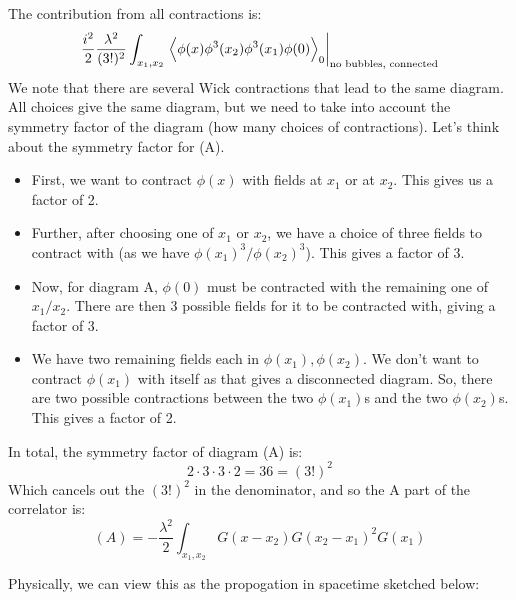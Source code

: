 The contribution from all contractions is:
\begin{equation}
    \frac{i^2}{2}\frac{\lambda^2}{(3!)^2}\int_{x_1, x_2}\left.\left< \phi(x)\phi^3(x_2)\phi^3(x_1)\phi(0) \right>_0\right|_{\text{no bubbles, connected}}
\end{equation}
We note that there are several Wick contractions that lead to the same diagram. All choices give the same diagram, but we need to take into account the symmetry factor of the diagram (how many choices of contractions). Let's think about the symmetry factor for (A). 
\begin{itemize}
    \item First, we want to contract $\phi(x)$ with fields at $x_1$ or at $x_2$. This gives us a factor of 2.
    \item Further, after choosing one of $x_1$ or $x_2$, we have a choice of three fields to contract with (as we have $\phi(x_1)^3/\phi(x_2)^3$). This gives a factor of 3.
    \item Now, for diagram A, $\phi(0)$ must be contracted with the remaining one of $x_1/x_2$. There are then 3 possible fields for it to be contracted with, giving a factor of 3.
    \item We have two remaining fields each in $\phi(x_1), \phi(x_2)$. We don't want to contract $\phi(x_1)$ with itself as that gives a disconnected diagram. So, there are two possible contractions between the two $\phi(x_1)$s and the two $\phi(x_2)$s. This gives a factor of 2.
\end{itemize}
In total, the symmetry factor of diagram (A) is:
\begin{equation}
    2 \cdot 3 \cdot 3 \cdot 2 = 36 = (3!)^2
\end{equation}
Which cancels out the $(3!)^2$ in the denominator, and so the A part of the correlator is:
\begin{equation}
    (A) =  -\frac{\lambda^2}{2}\int_{x_1, x_2}G(x - x_2)G(x_2 - x_1)^2 G(x_1)
\end{equation}

Physically, we can view this as the propogation in spacetime sketched below:

